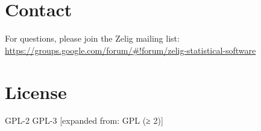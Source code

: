 \documentclass[letterpaper,10pt,english]{sphinxmanual}
\begin{document}
\chapter{Contact}
\label{index:contact}\label{index:id1}
For questions, please join the Zelig mailing list:
\href{https://groups.google.com/forum/\#!forum/zelig-statistical-software}{https://groups.google.com/forum/\#!forum/zelig-statistical-software}


\chapter{License}
\label{index:license}
GPL-2 \textbar{} GPL-3 {[}expanded from: GPL (≥ 2){]}



\renewcommand{\indexname}{Index}
\printindex
\end{document}
